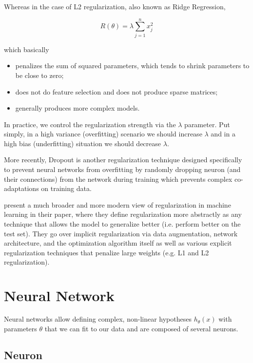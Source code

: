 Whereas in the case of L2 regularization, also known as Ridge Regression,

$$
R(\theta) = \lambda \sum_{j=1}^{n} x_j^2
$$

which basically

\begin{itemize}
    \item penalizes the sum of squared parameters, which tends to shrink parameters to be close to zero;
    \item does not do feature selection and does not produce sparse matrices;
    \item generally produces more complex models.
\end{itemize}

In practice, we control the regularization strength via the $\lambda$ parameter. Put simply, in a high variance (overfitting) scenario we should increase $\lambda$ and in a high bias (underfitting) situation we should decrease $\lambda$.

More recently, Dropout\cite{dropout} is another regularization technique designed specifically to prevent neural networks from overfitting by randomly dropping neuron (and their connections) from the network during training which prevents complex co-adaptations on training data.

\citeauthor{regularizationsurvey} present a much broader and more modern view of regularization in machine learning in their \citeyear{regularizationsurvey} paper\cite{regularizationsurvey}, where they define regularization more abstractly as any technique that allows the model to generalize better (i.e. perform better on the test set). They go over implicit regularization via data augmentation, network architecture, and the optimization algorithm itself as well as various explicit regularization techniques that penalize large weights (e.g. L1 and L2 regularization).

\section{Neural Network}

Neural networks allow defining complex, non-linear hypotheses $h_\theta(x)$ with parameters $\theta$ that we can fit to our data and are composed of several neurons.

\subsection{Neuron}

